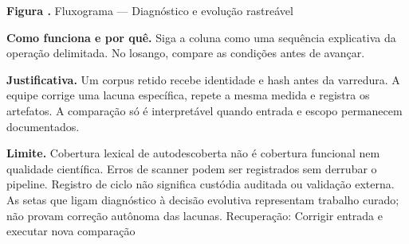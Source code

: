 {\small\textbf{Figura \thefigure.} Fluxograma --- Diagnóstico e evolução rastreável}\par\smallskip
\noindent\textbf{Como funciona e por quê.} Siga a coluna como uma sequência explicativa da operação delimitada. No losango, compare as condições antes de avançar.\par
\noindent\textbf{Justificativa.} Um corpus retido recebe identidade e hash antes da varredura. A equipe corrige uma lacuna específica, repete a mesma medida e registra os artefatos. A comparação só é interpretável quando entrada e escopo permanecem documentados.\par
\noindent\textbf{Limite.} Cobertura lexical de autodescoberta não é cobertura funcional nem qualidade científica. Erros de scanner podem ser registrados sem derrubar o pipeline. Registro de ciclo não significa custódia auditada ou validação externa. As setas que ligam diagnóstico à decisão evolutiva representam trabalho curado; não provam correção autônoma das lacunas. Recuperação: Corrigir entrada e executar nova comparação\par\smallskip
{}
